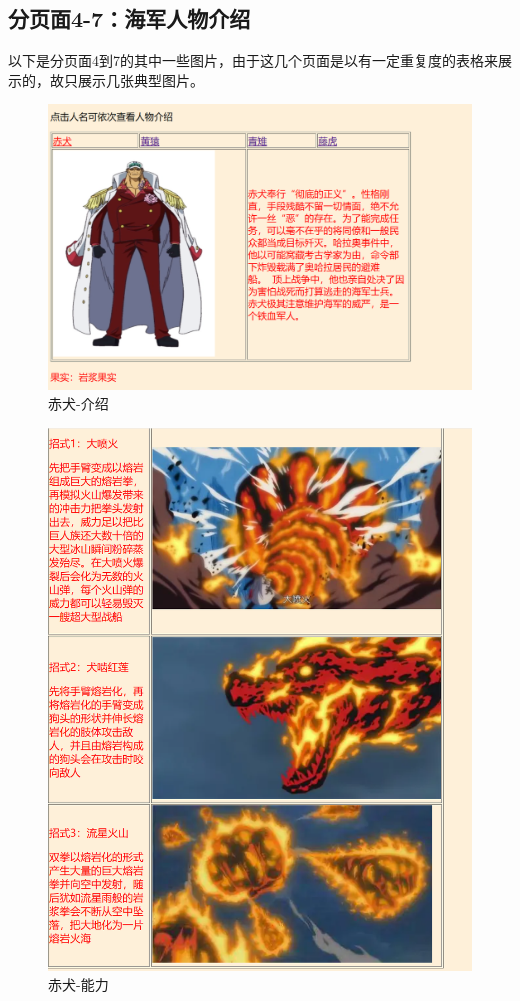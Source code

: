 \documentclass[supercite]{Experimental_Report}
\theoremstyle{definition}
\begin{document}
\subsection{分页面4-7：海军人物介绍}
以下是分页面4到7的其中一些图片，由于这几个页面是以有一定重复度的表格来展示的，故只展示几张典型图片。
\begin{figure}[htp]
	\begin{center}
		\includegraphics[scale=0.50]{images/fen4.1.png}
		\caption{赤犬-介绍}
		\label{fig3-8}
	\end{center}
\end{figure}
\begin{figure}[htp]
	\begin{center}
		\includegraphics[scale=0.50]{images/fen4.2.png}
		\caption{赤犬-能力}
		\label{fig3-9}
	\end{center}
\end{figure}
\end{document}
